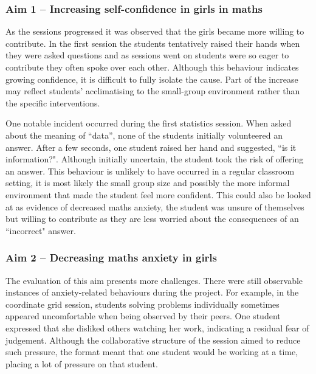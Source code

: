 \documentclass[11pt, a4paper, notitlepage]{article}
\begin{document}
\subsubsection*{Aim 1 -- Increasing self-confidence in girls in maths}
As the sessions progressed it was observed that the girls became more willing to contribute. In the first session the students tentatively raised their hands when they were asked questions and as sessions went on students were so eager to contribute they often spoke over each other. Although this behaviour indicates growing confidence, it is difficult to fully isolate the cause. Part of the increase may reflect students' acclimatising to the small-group environment rather than the specific interventions. 
\par
One notable incident occurred during the first statistics session. When asked about the meaning of ``data'', none of the students initially volunteered an answer. After a few seconds, one student raised her hand and suggested, ``is it information?". Although initially uncertain, the student took the risk of offering an answer. This behaviour is unlikely to have occurred in a regular classroom setting, it is most likely the small group size and possibly the more informal environment that made the student feel more confident. This could also be looked at as evidence of decreased maths anxiety, the student was unsure of themselves but willing to contribute as they are less worried about the consequences of an ``incorrect" answer.


\subsubsection*{Aim 2 -- Decreasing maths anxiety in girls}
The evaluation of this aim presents more challenges. There were still observable instances of anxiety-related behaviours during the project. For example, in the coordinate grid session, students solving problems individually sometimes appeared uncomfortable when being observed by their peers. One student expressed that she disliked others watching her work, indicating a residual fear of judgement. Although the collaborative structure of the session aimed to reduce such pressure, the format meant that one student would be working at a time, placing a lot of pressure on that student.
\end{document}
